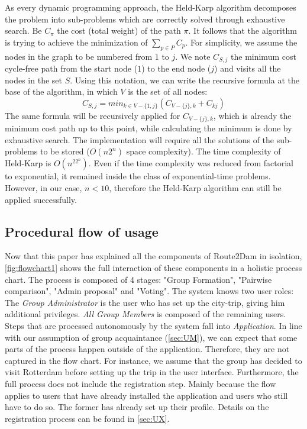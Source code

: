 \documentclass[11pt,a4paper,oneside]{article}
\begin{document}
As every dynamic programming approach, the Held-Karp algorithm decomposes the problem into sub-problems which are correctly solved through exhaustive search. Be $C_\pi$ the cost (total weight) of the path $\pi$. It follows that the algorithm is trying to achieve the minimization of $\sum_{p \in P}C_p$. For simplicity, we assume the nodes in the graph to be numbered from $1$ to $j$. We note $C_{S, j}$ the minimum cost cycle-free path from the start node ($1$) to the end node ($j$) and visits all the nodes in the set $S$. Using this notation, we can write the recursive formula at the base of the algorithm, in which $V$ is the set of all nodes:
\begin{equation}
C_{S, j} = min_{k \in V - \{1, j\}}(C_{V - \{j\}, k} + C_{kj})
\end{equation}
The same formula will be recursively applied for $C_{V - \{j\}, k}$, which is already the minimum cost path up to this point, while calculating the minimum is done by exhaustive search. The implementation will require all the solutions of the sub-problems to be stored ($O(n2^n)$ space complexity). The time complexity of Held-Karp is $O(n^22^n)$. Even if the time complexity was reduced from factorial to exponential, it remained inside the class of exponential-time problems. However, in our case, $n < 10$, therefore the Held-Karp algorithm can still be applied successfully.

\subsection{Procedural flow of usage}
Now that this paper has explained all the components of Route2Dam in isolation,
\autoref{fig:flowchart1} shows the full interaction of these components in a holistic process chart. The process is composed of 4 stages: "Group Formation", "Pairwise comparison", "Admin proposal" and "Voting". The system knows two user roles: The \emph{Group Administrator} is the user who has set up the city-trip, giving him additional privileges. \emph{All Group Members} is composed of the remaining users. Steps that are processed autonomously by the system fall into \emph{Application}. In line with our assumption of group acquaintance (\autoref{sec:UM}), we can expect that some parts of the process happen outside of the application. Therefore, they are not captured in the flow chart. For instance, we assume that the group has decided to visit Rotterdam before setting up the trip in the user interface. Furthermore, the full process does not include the registration step. Mainly because the flow applies to users that have already installed the application and users who still have to do so. The former has already set up their profile. Details on the registration process can be found in \autoref{sec:UX}.
\end{document}
